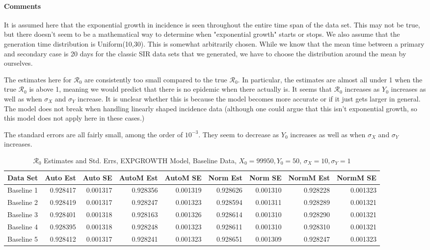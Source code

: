 \documentclass[12pt]{article}
\newcommand{\rr}{\ensuremath{\mathcal{R}_0}}
\begin{document}
\paragraph{Comments}

It is assumed here that the exponential growth in incidence is seen throughout the entire time span of the data set. This may not be true, but there doesn't seem to be a mathematical way to determine when "exponential growth" starts or stops. We also assume that the generation time distribution is Uniform(10,30). This is somewhat arbitrarily chosen. While we know that the mean time between a primary and secondary case is 20 days for the classic SIR data sets that we generated, we have to choose the distribution around the mean by ourselves.

The estimates here for $\rr$ are consistently too small compared to the true $\rr$. In particular, the estimates are almost all under 1 when the true $\rr$ is above 1, meaning we would predict that there is no epidemic when there actually is. It seems that $\rr$ increases as $Y_0$ increases as well as when $\sigma_X$ and $\sigma_Y$ increase. It is unclear whether this is because the model becomes more accurate or if it just gets larger in general. The model does not break when handling linearly shaped incidence data (although one could argue that this isn't exponential growth, so this model does not apply here in these cases.)

The standard errors are all fairly small, among the order of $10^{-3}$. They seem to decrease as $Y_0$ increases as well as when $\sigma_X$ and $\sigma_Y$ increases.

\begin{table}[H]
	
	\caption{$\rr$ Estimates and Std. Errs, EXPGROWTH Model, 
		Baseline Data, $X_0 = 99950, Y_0 = 50$, 
		$\sigma_X = 10, \sigma_Y = 1$}
	\begin{footnotesize}
		\hskip -1cm
		\begin{tabular}{l|r|r|r|r|r|r|r|r}
			\hline
			Data Set & Auto Est & Auto SE & AutoM Est & AutoM SE & Norm Est & Norm SE & NormM Est & NormM SE\\
			\hline
			Baseline 1 & 0.928417 & 0.001317 & 0.928356 & 0.001319 & 0.928626 & 0.001310 & 0.928228 & 0.001323\\
			\hline
			Baseline 2 & 0.928419 & 0.001317 & 0.928247 & 0.001323 & 0.928594 & 0.001311 & 0.928289 & 0.001321\\
			\hline
			Baseline 3 & 0.928401 & 0.001318 & 0.928163 & 0.001326 & 0.928614 & 0.001310 & 0.928290 & 0.001321\\
			\hline
			Baseline 4 & 0.928395 & 0.001318 & 0.928248 & 0.001323 & 0.928611 & 0.001310 & 0.928310 & 0.001321\\
			\hline
			Baseline 5 & 0.928412 & 0.001317 & 0.928241 & 0.001323 & 0.928651 & 0.001309 & 0.928247 & 0.001323\\
			\hline
		\end{tabular}
	\end{footnotesize}
\end{table}
\end{document}
